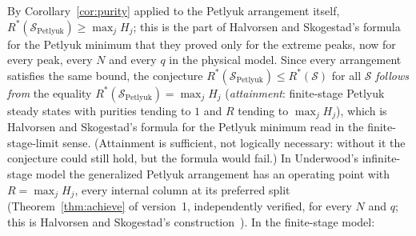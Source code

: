 By Corollary~\ref{cor:purity} applied to the Petlyuk arrangement itself, $R^*(\mathcal S_{\mathrm{Petlyuk}})\ge\max_jH_j$; this is
the part of Halvorsen and Skogestad's formula for the Petlyuk minimum that they proved only for the extreme peaks, now
for every peak, every $N$ and every $q$ in the physical model. Since every arrangement satisfies the same bound, the
conjecture $R^*(\mathcal S_{\mathrm{Petlyuk}})\le R^*(\mathcal S)$ for all $\mathcal S$ \emph{follows from} the equality
$R^*(\mathcal S_{\mathrm{Petlyuk}})=\max_jH_j$ (\emph{attainment}: finite-stage Petlyuk steady states with purities tending to $1$
and $R$ tending to $\max_jH_j$), which is Halvorsen and Skogestad's formula for the Petlyuk minimum read in the
finite-stage-limit sense. (Attainment is sufficient, not logically necessary: without it the conjecture could still
hold, but the formula would fail.) In Underwood's infinite-stage model the generalized Petlyuk arrangement has an operating point with
$R=\max_jH_j$, every internal column at its preferred split (Theorem~\ref{thm:achieve} of version~1, independently
verified, for every $N$ and $q$; this is Halvorsen and Skogestad's construction~\autocite{HS3}). In the finite-stage
model:

